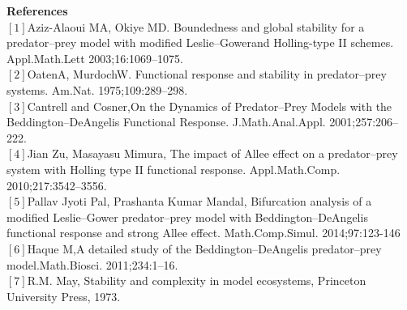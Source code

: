 \documentclass[a4paper, 10pt]{article}
\begin{document}
\textbf{\large References}\\
$[1]$Aziz-Alaoui MA, Okiye MD. Boundedness and global stability for a predator–prey model with modified Leslie–Gowerand Holling-type II schemes. Appl.Math.Lett 2003;16:1069–1075.\\
$[2]$OatenA, MurdochW. Functional response and stability in predator–prey systems. Am.Nat. 1975;109:289–298.\\
$[3]$Cantrell and Cosner,On the Dynamics of Predator–Prey Models with the Beddington–DeAngelis Functional Response. J.Math.Anal.Appl. 2001;257:206–222. \\
$[4]$Jian Zu, Masayasu Mimura, The impact of Allee effect on a predator–prey system with Holling type II functional response. Appl.Math.Comp. 2010;217:3542–3556.   \\
$[5]$Pallav Jyoti Pal, Prashanta Kumar Mandal, Bifurcation analysis of a modified Leslie–Gower predator–prey model with Beddington–DeAngelis functional response and strong Allee effect. Math.Comp.Simul. 2014;97:123-146 \\
$[6]$Haque M,A detailed study of the Beddington–DeAngelis predator–prey model.Math.Biosci. 2011;234:1–16.\\
$[7]$R.M. May, Stability and complexity in model ecosystems, Princeton University Press, 1973.\\
  
\end{document}
